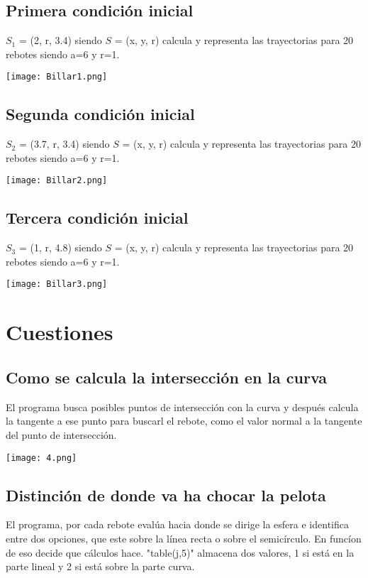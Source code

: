 \documentclass{article}
\begin{document}
\subsection{Primera condición inicial}
$S_1$ = (2, r, 3.4) siendo $S$ = (x, y, r) calcula y representa las trayectorias para 20 rebotes siendo a=6 y r=1.
\begin{center}
        \texttt{[image: Billar1.png]}
\end{center}

\subsection{Segunda condición inicial}
$S_2$ = (3.7, r, 3.4) siendo $S$ = (x, y, r) calcula y representa las trayectorias para 20 rebotes siendo a=6 y r=1.
\begin{center}
        \texttt{[image: Billar2.png]}
\end{center}

\subsection{Tercera condición inicial}
$S_3$ = (1, r, 4.8) siendo $S$ = (x, y, r) calcula y representa las trayectorias para 20 rebotes siendo a=6 y r=1.
\begin{center}
        \texttt{[image: Billar3.png]}
\end{center}


\section{Cuestiones}
\subsection{Como se calcula la intersección en la curva}
El programa busca posibles puntos de intersección con la curva y después calcula la tangente a ese punto para buscarl el rebote, como el valor normal a la tangente del punto de intersección.
\begin{center}
        \texttt{[image: 4.png]}
\end{center}

\newpage

\subsection{Distinción de donde va ha chocar la pelota}
El programa, por cada rebote evalúa hacia donde se dirige la esfera e identifica entre dos opciones, que este sobre la línea recta o sobre el semicírculo. En funcíon de eso decide que cálculos hace. "table(j,5)" almacena dos valores, 1 si está en la parte lineal y 2 si está sobre la parte curva.
\end{document}
